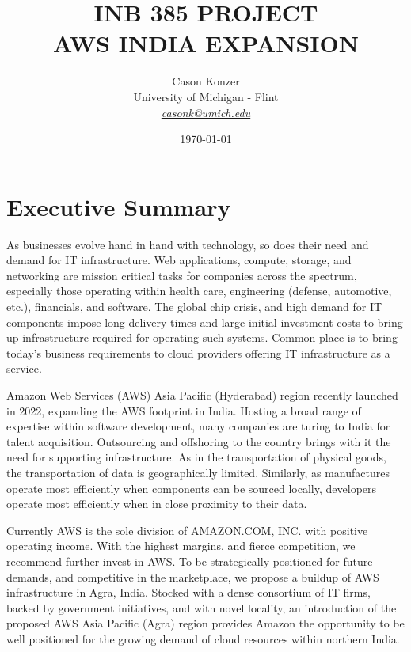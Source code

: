 \documentclass[a4paper, 12pt]{article}
\date{\today} %
\begin{document}
\title{INB 385 PROJECT \\ AWS INDIA EXPANSION}
\author{Cason Konzer   \\
       University of Michigan - Flint \\
       \textit{ \color{violet}
       \href{mailto:casonk@umich.edu}{casonk@umich.edu}}  %
       }
\maketitle
\newpage

\section*{Executive Summary}

As businesses evolve hand in hand with technology, so does their need and demand for IT infrastructure.
Web applications, compute, storage, and networking are mission critical tasks for companies across the spectrum, especially those operating within health care, engineering (defense, automotive, etc.), financials, and software.
The global chip crisis, and high demand for IT components impose long delivery times and large initial investment costs to bring up infrastructure required for operating such systems.
Common place is to bring today's business requirements to cloud providers offering IT infrastructure as a service.

Amazon Web Services (AWS) Asia Pacific (Hyderabad) region recently launched in 2022, expanding the AWS footprint in India.
Hosting a broad range of expertise within software development, many companies are turing to India for talent acquisition.
Outsourcing and offshoring to the country brings with it the need for supporting infrastructure.
As in the transportation of physical goods, the transportation of data is geographically limited.
Similarly, as manufactures operate most efficiently when components can be sourced locally, developers operate most efficiently when in close proximity to their data.

Currently AWS is the sole division of AMAZON.COM, INC. with positive operating income.
With the highest margins, and fierce competition, we recommend further invest in AWS.
To be strategically positioned for future demands, and competitive in the marketplace, we propose a buildup of AWS infrastructure in Agra, India.
Stocked with a dense consortium of IT firms, backed by government initiatives, and with novel locality, an introduction of the proposed AWS Asia Pacific (Agra) region provides Amazon the opportunity to be well positioned for the growing demand of cloud resources within northern India.
\end{document}
